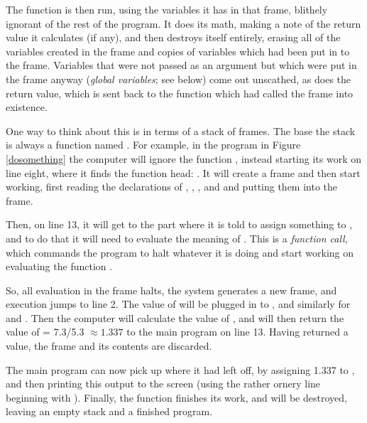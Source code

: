 \documentclass[12pt]{article}
\def\ind#1{\index{#1}#1}
\begin{document}
The function is then run, using the variables it has in that frame,
blithely ignorant of the rest of the program. It does its math, making a
note of the return value it calculates (if any), and then destroys itself
entirely, erasing all of the variables created in the frame and copies
of variables which had been put in to the frame. Variables that were not
passed as an argument but which were put in the frame anyway ({\sl global
variables}; see below) come out unscathed, as does the return value, which
is sent back to the function which had called the frame into existence.

\lstset{numbers=left, numberstyle=\scshape}
\lstset{numbers=none}

One way to think about this is in terms of a \ind{stack} of frames. 
The base the stack is always a function named . 
For example, in the program in Figure \ref{dosomething} 
the computer will ignore the function
, instead starting its work on line eight, where it
finds the  function head: .  It will
create a  frame and
then start working, first reading the declarations of ,
, , and  and putting them
into the frame.

Then, on line 13, it will get to the part where it is told to
assign something to , and to do that it will need
to evaluate the meaning of . This is a {\em function call}, which commands the program
to halt whatever it is doing and start working on evaluating the
function . 

So, all evaluation in the  frame halts, 
the system generates a new frame, and execution jumps to 
line 2. The value of 
will be plugged in to , and similarly for  and
. Then the computer will calculate the value of , and will then return the value of  =
7.3/5.3 $\approx 1.337$ to the main program on line 13. Having returned
a value, the  frame and its contents are
discarded.

The main program can now pick up where it had left off, by assigning
1.337 to , and then printing this output to the screen
(using the rather ornery line beginning with ).
Finally, the  function 
finishes its work, and will be destroyed, leaving an empty stack and a
finished program.
\end{document}
